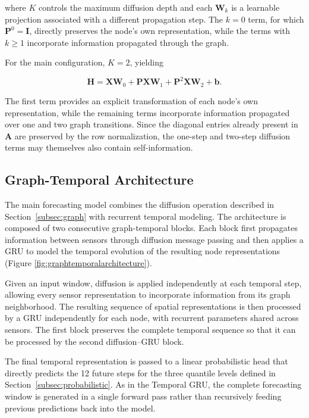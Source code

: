 where $K$ controls the maximum diffusion depth and each $\mathbf{W}_{k}$ is
a learnable projection associated with a different propagation step. The
$k=0$ term, for which $\mathbf{P}^{0}=\mathbf{I}$, directly preserves the
node's own representation, while the terms with $k\geq1$ incorporate
information propagated through the graph.

For the main configuration, $K=2$, yielding

\begin{equation}
    \mathbf{H}
    =
    \mathbf{X}\mathbf{W}_{0}
    +
    \mathbf{P}\mathbf{X}\mathbf{W}_{1}
    +
    \mathbf{P}^{2}\mathbf{X}\mathbf{W}_{2}
    +
    \mathbf{b}.
    \label{eq:diffusion_k2}
\end{equation}

The first term provides an explicit transformation of each node's own
representation, while the remaining terms incorporate information propagated
over one and two graph transitions. Since the diagonal entries already
present in $\mathbf{A}$ are preserved by the row normalization, the
one-step and two-step diffusion terms may themselves also contain
self-information.


\subsection{Graph-Temporal Architecture}
\label{subsec:graph_temporal}

The main forecasting model combines the diffusion operation described in
Section~\ref{subsec:graph} with recurrent temporal modeling. The architecture
is composed of two consecutive graph-temporal blocks. Each block first
propagates information between sensors through diffusion message passing and
then applies a GRU to model the temporal evolution of the resulting node
representations (Figure \ref{fig:graphtemporalarchitecture}).

Given an input window, diffusion is applied independently at each temporal
step, allowing every sensor representation to incorporate information from
its graph neighborhood. The resulting sequence of spatial representations is
then processed by a GRU independently for each node, with recurrent
parameters shared across sensors. The first block preserves the complete
temporal sequence so that it can be processed by the second diffusion--GRU
block.

The final temporal representation is passed to a linear probabilistic head
that directly predicts the 12 future steps for the three quantile levels
defined in Section~\ref{subsec:probabilistic}. As in the Temporal GRU, the
complete forecasting window is generated in a single forward pass rather
than recursively feeding previous predictions back into the model.

